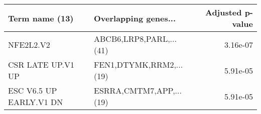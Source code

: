 \begin{tabular}{llr}
\toprule
         Term name (13) &    Overlapping genes... &  Adjusted p-value \\
\midrule
              NFE2L2.V2 & ABCB6,LRP8,PARL,...(41) &          3.16e-07 \\
      CSR LATE UP.V1 UP & FEN1,DTYMK,RRM2,...(19) &          5.91e-05 \\
ESC V6.5 UP EARLY.V1 DN & ESRRA,CMTM7,APP,...(19) &          5.91e-05 \\
\bottomrule
\end{tabular}
